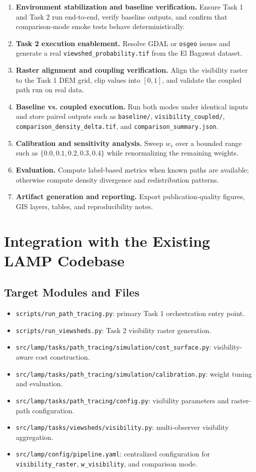 \documentclass[11pt]{article}
\let\oldsection\section
\renewcommand{\section}{\clearpage\oldsection}
\begin{document}
\begin{enumerate}
  \item \textbf{Environment stabilization and baseline verification.} Ensure Task 1 and Task 2 run end-to-end, verify baseline outputs, and confirm that comparison-mode smoke tests behave deterministically.
  \item \textbf{Task 2 execution enablement.} Resolve GDAL or \texttt{osgeo} issues and generate a real \texttt{viewshed\_probability.tif} from the El Bagawat dataset.
  \item \textbf{Raster alignment and coupling verification.} Align the visibility raster to the Task 1 DEM grid, clip values into $[0,1]$, and validate the coupled path run on real data.
  \item \textbf{Baseline vs. coupled execution.} Run both modes under identical inputs and store paired outputs such as \texttt{baseline/}, \texttt{visibility\_coupled/}, \texttt{comparison\_density\_delta.tif}, and \texttt{comparison\_summary.json}.
  \item \textbf{Calibration and sensitivity analysis.} Sweep $w_v$ over a bounded range such as $\{0.0, 0.1, 0.2, 0.3, 0.4\}$ while renormalizing the remaining weights.
  \item \textbf{Evaluation.} Compute label-based metrics when known paths are available; otherwise compute density divergence and redistribution patterns.
  \item \textbf{Artifact generation and reporting.} Export publication-quality figures, GIS layers, tables, and reproducibility notes.
\end{enumerate}

\section{Integration with the Existing LAMP Codebase}

\subsection{Target Modules and Files}

\begin{itemize}
  \item \texttt{scripts/run\_path\_tracing.py}: primary Task 1 orchestration entry point.
  \item \texttt{scripts/run\_viewsheds.py}: Task 2 visibility raster generation.
  \item \texttt{src/lamp/tasks/path\_tracing/simulation/cost\_surface.py}: visibility-aware cost construction.
  \item \texttt{src/lamp/tasks/path\_tracing/simulation/calibration.py}: weight tuning and evaluation.
  \item \texttt{src/lamp/tasks/path\_tracing/config.py}: visibility parameters and raster-path configuration.
  \item \texttt{src/lamp/tasks/viewsheds/visibility.py}: multi-observer visibility aggregation.
  \item \texttt{src/lamp/config/pipeline.yaml}: centralized configuration for \texttt{visibility\_raster}, \texttt{w\_visibility}, and comparison mode.
\end{itemize}
\end{document}
